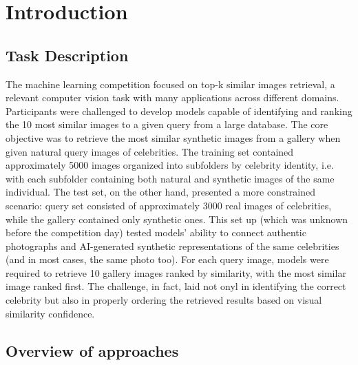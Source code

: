 \section{Introduction}
\label{sec:intro}


\subsection{Task Description}

The machine learning competition focused on top-k similar images retrieval, a relevant computer vision task with many applications across different domains.
Participants were challenged to develop models capable of identifying and ranking the 10 most similar images to a given query from a large database.
The core objective was to retrieve the most similar synthetic images from a gallery when given natural query images of celebrities.
The training set contained approximately 5000 images organized into subfolders by celebrity identity, i.e. with each subfolder containing both natural and synthetic images of the same individual.
The test set, on the other hand, presented a more constrained scenario: query set consisted of approximately 3000 real images of celebrities, while the gallery contained only synthetic ones. 
This set up (which was unknown before the competition day) tested models' ability to connect authentic photographs and AI-generated synthetic representations of the same celebrities (and in most cases, the same photo too). 
For each query image, models were required to retrieve 10 gallery images ranked by similarity, with the most similar image ranked first. 
The challenge, in fact, laid not onyl in identifying the correct celebrity but also in properly ordering the retrieved results based on visual similarity confidence. 

\subsection{Overview of approaches}

